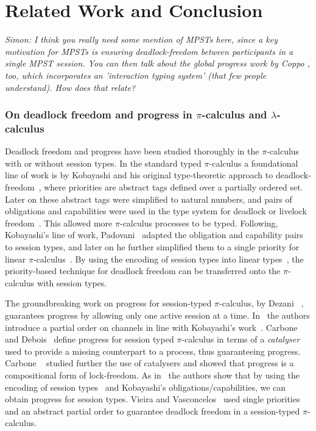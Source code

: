 \documentclass[main.tex]{subfiles}
\begin{document}
\section{Related Work and Conclusion}
\textit{Simon: I think you really need some mention of MPSTs here, since a key motivation for MPSTs is ensuring deadlock-freedom between participants in a single MPST session. You can then talk about the global progress work by Coppo \etal, too, which incorporates an 'interaction typing system' (that few people understand). How does that relate?}

\subsubsection*{On deadlock freedom and progress in $\pi$-calculus and $\lambda$-calculus}
Deadlock freedom and progress have been studied thoroughly in the $\pi$-calculus with or without session types.
In the standard typed $\pi$-calculus a foundational line of work is by Kobayashi and his original type-theoretic approach to deadlock-freedom~\cite{kobayashi98}, where priorities are abstract tags defined over a partially ordered set. Later on these abstract tags were simplified to natural numbers, and pairs of obligations and capabilities were used in the type system for deadlock or livelock freedom~\cite{kobayashi02,kobayashi06}. This allowed more $\pi$-calculus processes to be typed. Following, Kobayashi's line of work, Padovani~\cite{padovani13} adapted the obligation and capability pairs to session types, and later on he further simplified them to a single priority for linear $\pi$-calculus~\cite{padovani14}. By using the encoding of session types into linear types~\cite{kobayashi07,dardhagiachino12,dardha14beat,dardha16}, the priority-based technique for deadlock freedom can be transferred onto the $\pi$-calculus with session types.

The groundbreaking work on progress for session-typed $\pi$-calculus, by Dezani \etal~\cite{dezani-ciancaglinimostrous06}, guarantees progress by allowing only one active session at a time. In~\cite{dezani-ciancagliniliguoro09progress} the authors introduce a partial order on channels in line with Kobayashi's work~\cite{kobayashi98}. Carbone and Debois~\cite{carbonedebois10} define progress for session typed $\pi$-calculus in terms of a \emph{catalyser} used to provide a missing counterpart to a process, thus guaranteeing progress.
Carbone \etal~\cite{carbonedardha14} studied further the use of catalysers and showed that progress is a compositional form of lock-freedom. As in~\cite{padovani14} the authors show that by using the encoding of session types~\cite{dardhagiachino12} and Kobayashi's obligations/capabilities, we can obtain progress for session types. Vieira and Vasconcelos~\cite{vieiravasconcelos13} used single priorities and an abstract partial order to guarantee deadlock freedom in a session-typed $\pi$-calculus.
\end{document}
